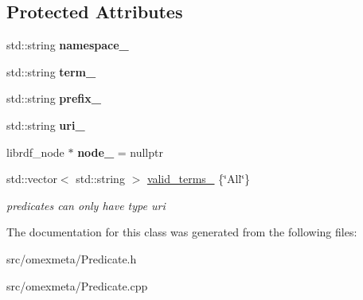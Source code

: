 \subsection*{Protected Attributes}
\begin{DoxyCompactItemize}
\item 
\mbox{\label{classomexmeta_1_1Predicate_afc79b0cc43eb11e4bc2fe0b305e551bc}} 
std\+::string {\bfseries namespace\+\_\+}
\item 
\mbox{\label{classomexmeta_1_1Predicate_ab626a5fd9fa8f302767d4ca544a9eff2}} 
std\+::string {\bfseries term\+\_\+}
\item 
\mbox{\label{classomexmeta_1_1Predicate_a5dfbbc85f7bdc5a3e4da72913f6ce306}} 
std\+::string {\bfseries prefix\+\_\+}
\item 
\mbox{\label{classomexmeta_1_1Predicate_a4fe359b93a9dea9b60f7bc28c1aa913b}} 
std\+::string {\bfseries uri\+\_\+}
\item 
\mbox{\label{classomexmeta_1_1Predicate_ad0548a6d31dbc6f32734032b1540e58f}} 
librdf\+\_\+node $\ast$ {\bfseries node\+\_\+} = nullptr
\item 
\mbox{\label{classomexmeta_1_1Predicate_a14ae7768fbd3aaf444bcde8650910c0b}} 
std\+::vector$<$ std\+::string $>$ \hyperlink{classomexmeta_1_1Predicate_a14ae7768fbd3aaf444bcde8650910c0b}{valid\+\_\+terms\+\_\+} \{\char`\"{}All\char`\"{}\}
\begin{DoxyCompactList}\small\item\em predicates can only have type uri \end{DoxyCompactList}\end{DoxyCompactItemize}


The documentation for this class was generated from the following files\+:\begin{DoxyCompactItemize}
\item 
src/omexmeta/Predicate.\+h\item 
src/omexmeta/Predicate.\+cpp\end{DoxyCompactItemize}
